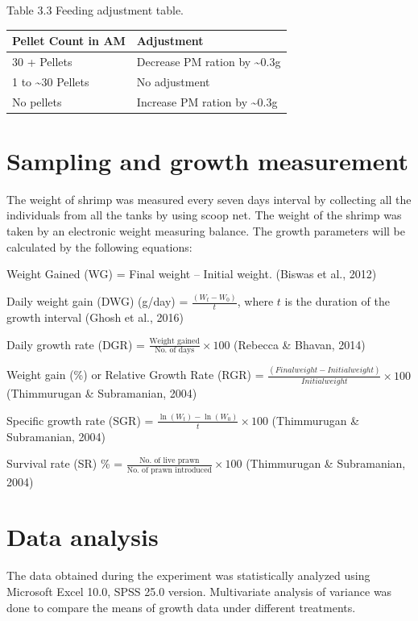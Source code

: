\documentclass[
]{book}
\begin{document}
Table 3.3 Feeding adjustment table.

\begin{longtable}[]{@{}ll@{}}
\toprule()
Pellet Count in AM & Adjustment \\
\midrule()
\endhead
30 + Pellets & Decrease PM ration by \textasciitilde0.3g \\
1 to \textasciitilde30 Pellets & No adjustment \\
No pellets & Increase PM ration by \textasciitilde0.3g \\
\bottomrule()
\end{longtable}

\hypertarget{sampling-and-growth-measurement}{%
\section{Sampling and growth measurement}\label{sampling-and-growth-measurement}}

The weight of shrimp was measured every seven days interval by collecting all the individuals from all the tanks by using scoop net. The weight of the shrimp was taken by an electronic weight measuring balance. The growth parameters will be calculated by the following equations:

Weight Gained (WG) = Final weight -- Initial weight. (Biswas et al., 2012)

Daily weight gain (DWG) (g/day) = \(\frac{{(W_t - W_0)}}{t}\), where \(t\) is the duration of the growth interval (Ghosh et al., 2016)

Daily growth rate (DGR) = \(\frac{{\text{{Weight gained}}}}{{\text{{No. of days}}}} \times 100\) (Rebecca \& Bhavan, 2014)

Weight gain (\%) or Relative Growth Rate (RGR) = \(\frac{{(Final weight - Initial weight)}}{{Initial weight}} \times 100\) (Thimmurugan \& Subramanian, 2004)

Specific growth rate (SGR) = \(\frac{{\ln(W_t) - \ln(W_0)}}{t} \times 100\) (Thimmurugan \& Subramanian, 2004)

Survival rate (SR) \% = \(\frac{{\text{{No. of live prawn}}}}{{\text{{No. of prawn introduced}}}} \times 100\) (Thimmurugan \& Subramanian, 2004)

\hypertarget{data-analysis}{%
\section{Data analysis}\label{data-analysis}}

The data obtained during the experiment was statistically analyzed using Microsoft Excel 10.0, SPSS 25.0 version. Multivariate analysis of variance was done to compare the means of growth data under different treatments.
\end{document}
